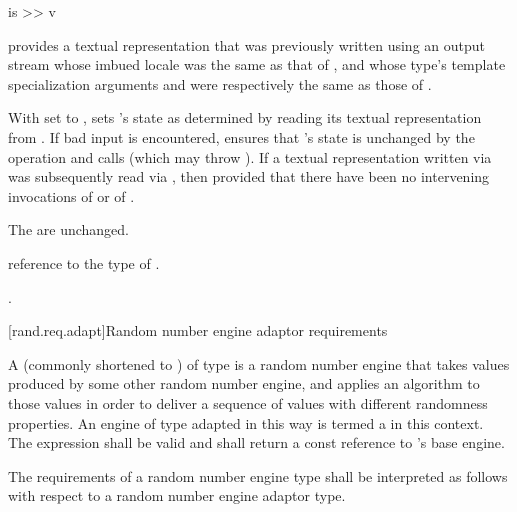 \begin{itemdecl}
is >> v
\end{itemdecl}

\begin{itemdescr}
\pnum
\expects
{} provides a textual representation
that was previously written
using an output stream
whose imbued locale
was the same as that of ,
and whose type's template specialization arguments
 and 
were respectively the same as those of .

\pnum
\effects
With 
set to ,
sets 's state
as determined by reading its textual representation from .
If bad input is encountered,
ensures that 's state is unchanged by the operation
and
calls 
(which may throw ).
If a textual representation written via 
was subsequently read via ,
then 
provided that there have been no intervening invocations
of  or of .

\pnum
\ensures
The  are unchanged.

\pnum
\result
reference to the type of .

\pnum
\returns
{}.

\pnum
\complexity
{}
\end{itemdescr}

%



[rand.req.adapt]{Random number engine adaptor requirements}%

\pnum
A 
(commonly shortened to )
 of type 
is a random number engine
that takes values
produced by some other random number engine,
and applies an algorithm to those values
in order to deliver a sequence of values
with different randomness properties.
An engine  of type  adapted in this way
is termed a 
in this context.
The expression  shall be valid and shall return a
const reference to 's base engine.

\pnum
The requirements of a random number engine type
shall be interpreted as follows
with respect to a random number engine adaptor type.

